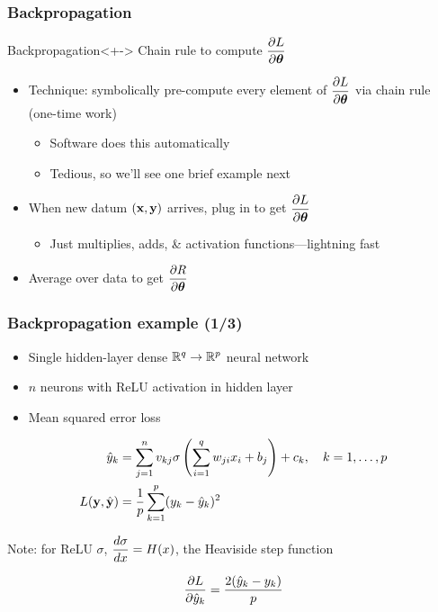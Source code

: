 \begin{frame}
    \frametitle{Backpropagation}


    \begin{block}{Backpropagation}<+->
        Chain rule to compute $\dfrac{\partial L}{\partial \bm{\theta}}$
    \end{block}

    \begin{itemize}
        \item<+-> Technique: symbolically pre-compute every element of $\dfrac{\partial L}{\partial \bm{\theta}}$ via chain rule (one-time work)
        \begin{itemize}
            \item Software does this automatically
            \item Tedious, so we'll see one brief example next
        \end{itemize}
        \item<+-> When new datum $(\mathbf{x}, \mathbf{y})$ arrives, plug in to get $\dfrac{\partial L}{\partial \bm{\theta}}$
        \begin{itemize}
            \item Just multiplies, adds, \& activation functions---lightning fast
        \end{itemize}
        \item<+-> Average over data to get $\dfrac{\partial R}{\partial \bm{\theta}}$
    \end{itemize}
\end{frame}

\begin{frame}
    \frametitle{Backpropagation example (1/3)}
    \begin{itemize}
        \item Single hidden-layer dense $\mathbb{R}^q \to \mathbb{R}^p$ neural network
        \item $n$ neurons with ReLU activation in hidden layer
        \item Mean squared error loss
    \end{itemize}

    \begin{block}{}
        \vspace{-1em}
        \begin{align*}
            \hat{y}_k &= \sum_{j=1}^n v_{kj} \sigma\left(\sum_{i=1}^q w_{ji} x_i + b_j\right) + c_k,
            \quad
            k = 1, \ldots, p \\
            L(\mathbf{y}, \hat{\mathbf{y}}) &= \frac{1}{p} \sum_{k=1}^p (y_k - \hat{y}_k)^2
        \end{align*}
    \end{block}
    \pause

    Note: for ReLU $\sigma$, $\dfrac{d \sigma}{d x} = H(x)$, the Heaviside step function

    \begin{equation*}
        \dfrac{\partial L}{\partial \hat{y}_k} = \frac{2 (\hat{y}_k - y_k)}{p}
    \end{equation*}
\end{frame}

